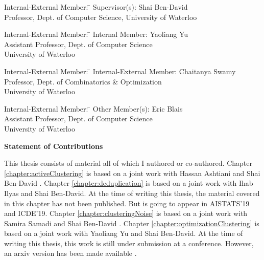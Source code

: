 \documentclass[letterpaper,12pt,titlepage,oneside,final]{book}
\let\origdoublepage\cleardoublepage
\newcommand{\clearemptydoublepage}{%
  \clearpage{\pagestyle{empty}\origdoublepage}}
\let\cleardoublepage\clearemptydoublepage
\begin{document}
  \noindent
\begin{tabbing}
Internal-External Member: \=  \kill %
Supervisor(s): \> Shai Ben-David \\
\> Professor, Dept. of Computer Science, University of Waterloo \\
\end{tabbing}
  \bigskip
  
  \noindent
  \begin{tabbing}
Internal-External Member: \=  \kill %
Internal Member: \> Yaoliang Yu \\
\> Assistant Professor, Dept. of Computer Science\\
\> University of Waterloo \\
\end{tabbing}
  \bigskip
  
  \noindent
\begin{tabbing}
Internal-External Member: \=  \kill %
Internal-External Member: \> Chaitanya Swamy \\
\> Professor, Dept. of Combinatorics \& Optimization\\ \>University of Waterloo \\
\end{tabbing}
  \bigskip
  
  \noindent
\begin{tabbing}
Internal-External Member: \=  \kill %
Other Member(s): \> Eric Blais \\
\> Assistant Professor, Dept. of Computer Science\\
\> University of Waterloo \\
\end{tabbing}

\cleardoublepage

\begin{center}\textbf{Statement of Contributions}\end{center}
  \noindent
This thesis consists of material all of which I authored or co-authored. Chapter \ref{chapter:activeClustering} is based on a joint work with Hassan Ashtiani and Shai Ben-David \cite{ashtiani2016clustering}. Chapter \ref{chapter:deduplication} is based on a joint work with Ihab Ilyas and Shai Ben-David. At the time of writing this thesis, the material covered in this chapter has not been published. But is going to appear in AISTATS'19 and ICDE'19. Chapter \ref{chapter:clusteringNoise} is based on a joint work with Samira Samadi and Shai Ben-David \cite{kushagra2016finding}. Chapter \ref{chapter:optimizationClustering} is based on a joint work with Yaoliang Yu and Shai Ben-David. At the time of writing this thesis, this work is still under submission at a conference. However, an arxiv version has been made available \cite{kushagra2017provably}. 
\end{document}
